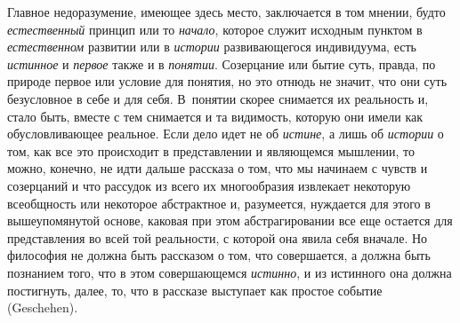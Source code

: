 Главное недоразумение, имеющее здесь место, заключается в том
мнении, будто {\em естественный} принцип или то {\em начало}, которое
служит исходным пунктом в {\em естественном} развитии или в {\em истории}
развивающегося индивидуума, есть {\em истинное} и {\em первое} также и в
{\em понятии}. Созерцание
или бытие суть, правда, по природе первое или условие для понятия, но это
отнюдь не значит, что они суть безусловное в себе и для себя. В~понятии
скорее снимается их реальность и, стало быть, вместе с тем снимается и та
видимость, которую они имели как обусловливающее реальное. Если дело идет
не об {\em истине}, а лишь об {\em истории} о
том, как все это происходит в представлении и являющемся мышлении, то
можно, конечно, не идти дальше рассказа о том, что мы начинаем с чувств и
созерцаний и что рассудок из всего их многообразия извлекает некоторую
всеобщность или некоторое абстрактное и, разумеется, нуждается для этого в
вышеупомянутой основе, каковая при этом абстрагировании все еще остается
для представления во всей той реальности, с которой она явила себя вначале.
Но философия не должна быть рассказом о том, что совершается, а должна быть
познанием того, что в этом совершающемся {\em истинно}, и из
истинного она должна постигнуть, далее, то, что в рассказе выступает как
простое событие (Geschehen).

